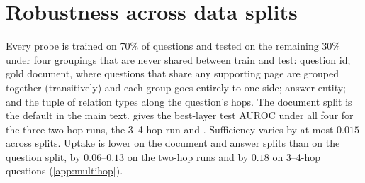 \section{Robustness across data splits}
\label{app:splits}
Every probe is trained on 70\% of questions and tested on the remaining 30\% under four groupings that are never shared between train and test: question id; gold document, where questions that share any supporting page are grouped together (transitively) and each group goes entirely to one side; answer entity; and the tuple of relation types along the question's hops. The document split is the default in the main text.  gives the best-layer test AUROC under all four for the three two-hop runs, the 3--4-hop run and \twowiki{}. Sufficiency varies by at most $0.015$ across splits. Uptake is lower on the document and answer splits than on the question split, by $0.06$--$0.13$ on the two-hop runs and by $0.18$ on 3--4-hop questions (\cref{app:multihop}).
\begin{table}[h]
\centering\small

\caption{Best-layer AUROC under the four disjoint splits, for the three 2-hop runs, the 3--4-hop run and \twowiki{}.}
\label{tab:splits}
\end{table}
